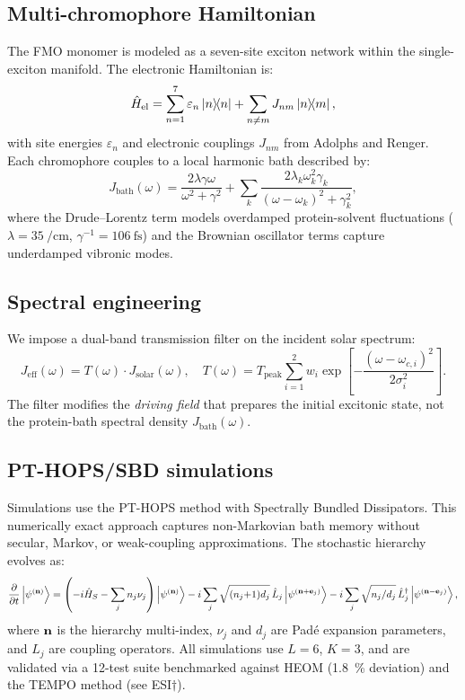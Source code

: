 \documentclass[11pt,a4paper]{article}
\begin{document}
\subsection{Multi-chromophore Hamiltonian}
The FMO monomer is modeled as a seven-site exciton network within the single-exciton manifold. The electronic Hamiltonian is:
\begin{equation}
\hat{H}_{\mathrm{el}} = \sum_{n=1}^{7} \varepsilon_n \dyad{n} + \sum_{n \neq m} J_{nm} \dyad{n}{m},
\end{equation}
with site energies $\varepsilon_n$ and electronic couplings $J_{nm}$ from Adolphs and Renger.\cite{Adolphs2006} Each chromophore couples to a local harmonic bath described by:\cite{Moix2011}
\begin{equation}
J_{\mathrm{bath}}(\omega) = \frac{2\lambda\gamma\omega}{\omega^2 + \gamma^2} + \sum_k \frac{2\lambda_k\omega_k^2\gamma_k}{(\omega-\omega_k)^2 + \gamma_k^2},
\label{eq:spectral_density}
\end{equation}
where the Drude--Lorentz term models overdamped protein-solvent fluctuations ($\lambda = \SI{35}{\per\centi\meter}$, $\gamma^{-1} = \SI{106}{\femto\second}$) and the Brownian oscillator terms capture underdamped vibronic modes.\cite{Chin2013}

\subsection{Spectral engineering}
We impose a dual-band transmission filter on the incident solar spectrum:
\begin{equation}
J_{\mathrm{eff}}(\omega) = T(\omega) \cdot J_{\mathrm{solar}}(\omega), \quad T(\omega) = T_{\mathrm{peak}} \sum_{i=1}^{2} w_i \exp\!\left[-\frac{(\omega - \omega_{c,i})^2}{2\sigma_i^2}\right].
\label{eq:filtered_spectral_density}
\end{equation}
The filter modifies the \textit{driving field} that prepares the initial excitonic state, not the protein-bath spectral density $J_{\mathrm{bath}}(\omega)$.

\subsection{PT-HOPS/SBD simulations}
Simulations use the PT-HOPS method with Spectrally Bundled Dissipators.\cite{Suess2014,Citty2024a} This numerically exact approach captures non-Markovian bath memory without secular, Markov, or weak-coupling approximations. The stochastic hierarchy evolves as:
\begin{equation}
\pdv{t}\ket{\psi^{(\vb{n})}} = \left(-i\hat{H}_S - \sum_j n_j\nu_j\right)\ket{\psi^{(\vb{n})}}
- i\sum_j \sqrt{(n_j{+}1)d_j}\,\hat{L}_j\ket{\psi^{(\vb{n}+\vb{e}_j)}}
- i\sum_j \sqrt{n_j/d_j}\,\hat{L}_j^\dagger\ket{\psi^{(\vb{n}-\vb{e}_j)}},
\end{equation}
where $\vb{n}$ is the hierarchy multi-index, $\nu_j$ and $d_j$ are Padé expansion parameters, and $\hat{L}_j$ are coupling operators.\cite{Duan2017} All simulations use $L = 6$, $K = 3$, and are validated via a 12-test suite benchmarked against HEOM\cite{Ishizaki2009a} (\SI{1.8}{\percent} deviation) and the TEMPO method\cite{Strathearn2018} (see ESI$\dagger$).
\end{document}
